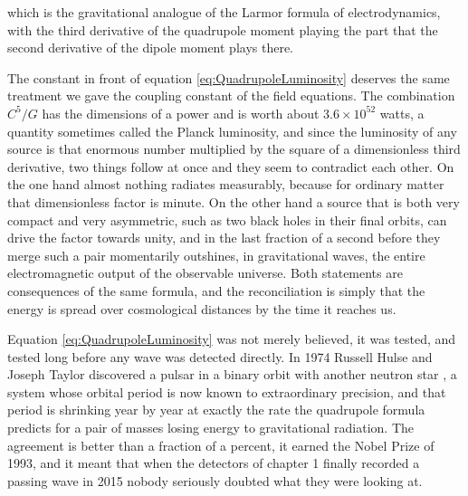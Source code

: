         which is the gravitational analogue of the Larmor formula of electrodynamics, with the third derivative of the quadrupole moment playing the part that the second derivative of the dipole moment plays there.

        The constant in front of equation \ref{eq:QuadrupoleLuminosity} deserves the same treatment we gave the coupling constant of the field equations. The combination $C^5/G$ has the dimensions of a power and is worth about $3.6\times10^{52}$ watts, a quantity sometimes called the Planck luminosity, and since the luminosity of any source is that enormous number multiplied by the square of a dimensionless third derivative, two things follow at once and they seem to contradict each other. On the one hand almost nothing radiates measurably, because for ordinary matter that dimensionless factor is minute. On the other hand a source that is both very compact and very asymmetric, such as two black holes in their final orbits, can drive the factor towards unity, and in the last fraction of a second before they merge such a pair momentarily outshines, in gravitational waves, the entire electromagnetic output of the observable universe. Both statements are consequences of the same formula, and the reconciliation is simply that the energy is spread over cosmological distances by the time it reaches us.

        Equation \ref{eq:QuadrupoleLuminosity} was not merely believed, it was tested, and tested long before any wave was detected directly. In 1974 Russell Hulse and Joseph Taylor discovered a pulsar in a binary orbit with another neutron star \citep{hulse1975}, a system whose orbital period is now known to extraordinary precision, and that period is shrinking year by year at exactly the rate the quadrupole formula predicts for a pair of masses losing energy to gravitational radiation. The agreement is better than a fraction of a percent, it earned the Nobel Prize of 1993, and it meant that when the detectors of chapter 1 finally recorded a passing wave in 2015 nobody seriously doubted what they were looking at.
